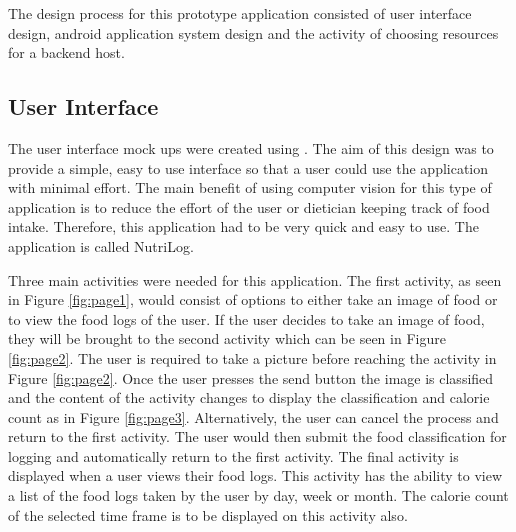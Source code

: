 The design process for this prototype application consisted of user interface design, android application system design and the activity of choosing resources for a backend host.

\tocless\subsection{User Interface}
The user interface mock ups were created using \parencite{fluid}.
The aim of this design was to provide a simple, easy to use interface so that a user could use the application with minimal effort.
The main benefit of using computer vision for this type of application is to
reduce the effort of the user or dietician keeping track of food intake.
Therefore, this application had to be very quick and easy to use.
The application is called NutriLog.

Three main activities were needed for this application.
The first activity, as seen in Figure \ref{fig:page1}, would consist of options to either take an image of food or to view the food logs of the user.
If the user decides to take an image of food, they will be brought to the second activity which can be seen in Figure \ref{fig:page2}.
The user is required to take a picture before reaching the activity in Figure \ref{fig:page2}.
Once the user presses the send button the image is classified and the content of the activity changes to display the classification and calorie count as in Figure \ref{fig:page3}.
Alternatively, the user can cancel the process and return to the first activity.
The user would then submit the food classification for logging and automatically return to the first activity.
The final activity is displayed when a user views their food logs.
This activity has the ability to view a list of the food logs taken by the user by day, week or month.
The calorie count of the selected time frame is to be displayed on this activity also.

